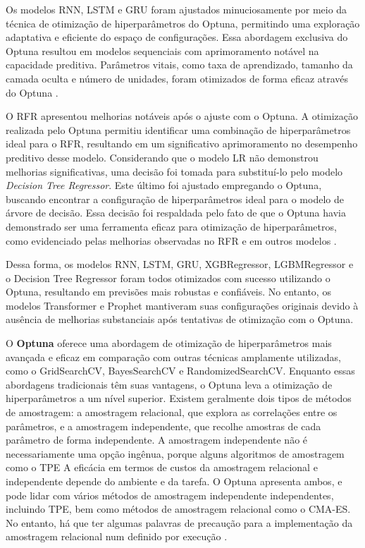 Os modelos RNN, LSTM e GRU foram ajustados minuciosamente por meio da técnica de otimização de hiperparâmetros do Optuna, permitindo uma exploração adaptativa e eficiente do espaço de configurações. Essa abordagem exclusiva do Optuna resultou em modelos sequenciais com aprimoramento notável na capacidade preditiva. Parâmetros vitais, como taxa de aprendizado, tamanho da camada oculta e número de unidades, foram otimizados de forma eficaz através do Optuna \cite{DBLP}.

O RFR apresentou melhorias notáveis após o ajuste com o Optuna. A otimização realizada pelo Optuna permitiu identificar uma combinação de hiperparâmetros ideal para o RFR, resultando em um significativo aprimoramento no desempenho preditivo desse modelo.
Considerando que o modelo LR não demonstrou melhorias significativas, uma decisão foi tomada para substituí-lo pelo modelo \textit{Decision Tree Regressor}. Este último foi ajustado empregando o Optuna, buscando encontrar a configuração de hiperparâmetros ideal para o modelo de árvore de decisão. Essa decisão foi respaldada pelo fato de que o Optuna havia demonstrado ser uma ferramenta eficaz para otimização de hiperparâmetros, como evidenciado pelas melhorias observadas no RFR e em outros modelos \cite{DBLP}.

Dessa forma, os modelos RNN, LSTM, GRU, XGBRegressor, LGBMRegressor e o Decision Tree Regressor foram todos otimizados com sucesso utilizando o Optuna, resultando em previsões mais robustas e confiáveis. No entanto, os modelos Transformer e Prophet mantiveram suas configurações originais devido à ausência de melhorias substanciais após tentativas de otimização com o Optuna.

O \textbf{Optuna} oferece uma abordagem de otimização de hiperparâmetros mais avançada e eficaz em comparação com outras técnicas amplamente utilizadas, como o GridSearchCV, BayesSearchCV e RandomizedSearchCV. Enquanto essas abordagens tradicionais têm suas vantagens, o Optuna leva a otimização de hiperparâmetros a um nível superior.
Existem geralmente dois tipos de métodos de amostragem: a amostragem relacional, que explora as correlações entre os parâmetros, e a amostragem independente, que recolhe amostras de cada parâmetro de forma independente. A amostragem independente não é necessariamente uma opção ingênua, porque alguns algoritmos de amostragem como o TPE A eficácia em termos de custos da amostragem relacional e independente depende do ambiente e da tarefa. O Optuna apresenta ambos, e pode lidar com vários métodos de amostragem independente independentes, incluindo TPE, bem como métodos de amostragem relacional como o CMA-ES. No entanto, há que ter algumas palavras de precaução para a implementação da amostragem relacional num definido por execução \cite{DBLP}.

